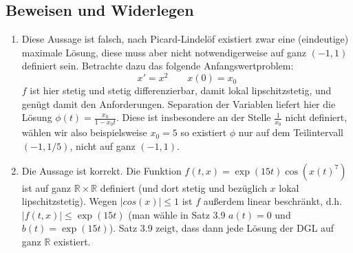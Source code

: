 \documentclass[a4paper]{article}
\begin{document}
\subsection{Beweisen und Widerlegen}

\begin{enumerate}
	\item Diese Aussage ist falsch, nach Picard-Lindelöf existiert zwar eine (eindeutige) maximale Lösung, diese muss aber nicht notwendigerweise auf ganz $(-1, 1)$ definiert sein. Betrachte dazu das folgende Anfangswertproblem:
	      \begin{equation*}
		      x' = x^2 \qquad x(0) = x_0
	      \end{equation*}
	      $f$ ist hier stetig und stetig differenzierbar, damit lokal lipschitzstetig, und genügt damit den Anforderungen. Separation der Variablen liefert hier die Lösung $\phi(t) = \frac{x_0}{1 - x_0 t}$. Diese ist insbesondere an der Stelle $\frac{1}{x_0}$ nicht definiert, wählen wir also beispielsweise $x_0 = 5$ so existiert $\phi$ nur auf dem Teilintervall $(-1, 1/5)$, nicht auf ganz $(-1,1)$.
	\item Die Aussage ist korrekt. Die Funktion $f(t,x) = \exp(15 t) \cos(x(t)^7)$ ist auf ganz $\mathds{R} \times \mathds{R}$ definiert (und dort stetig und bezüglich $x$ lokal lipschitzstetig). Wegen $|cos(x)| \leq 1$ ist $f$ außerdem linear beschränkt, d.h. $|f(t,x)| \leq \exp(15 t)$ (man wähle in Satz 3.9 $a(t)  = 0$ und $b(t) = \exp(15 t)$). Satz 3.9 zeigt, dass dann jede Lösung der DGL auf ganz $\mathds{R}$ existiert.
\end{enumerate}
\end{document}
